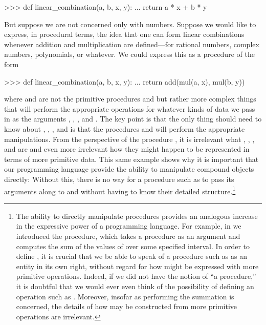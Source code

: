 \begin{codeBlock}
>>> def linear_combination(a, b, x, y):
...     return a * x + b * y
\end{codeBlock}

\noindent
But suppose we are not concerned only with numbers.  Suppose we would like to
express, in procedural terms, the idea that one can form linear combinations
whenever addition and multiplication are defined---for rational numbers,
complex numbers, polynomials, or whatever.  We could express this as a
procedure of the form

\begin{codeBlock}
>>> def linear_combination(a, b, x, y):
...     return add(mul(a, x), mul(b, y))
\end{codeBlock}

\noindent
where  and  are not the primitive procedures \code{+} and
\code{*} but rather more complex things that will perform the appropriate
operations for whatever kinds of data we pass in as the arguments ,
, , and . The key point is that the only thing
 should need to know about , ,
, and  is that the procedures  and  will
perform the appropriate manipulations.  From the perspective of the procedure
, it is irrelevant what , , ,
and  are and even more irrelevant how they might happen to be
represented in terms of more primitive data.  This same example shows why it is
important that our programming language provide the ability to manipulate
compound objects directly: Without this, there is no way for a procedure such
as  to pass its arguments along to  and
 without having to know their detailed structure.\footnote{The
ability to directly manipulate procedures provides an analogous increase in the
expressive power of a programming language.  For example, in
 we introduced the  procedure, which takes a procedure
 as an argument and computes the sum of the values of 
over some specified interval.  In order to define , it is crucial
that we be able to speak of a procedure such as  as an entity in its
own right, without regard for how  might be expressed with more
primitive operations.  Indeed, if we did not have the notion of ``a
procedure,'' it is doubtful that we would ever even think of the possibility of
defining an operation such as .  Moreover, insofar as performing the
summation is concerned, the details of how  may be constructed from
more primitive operations are irrelevant.}

